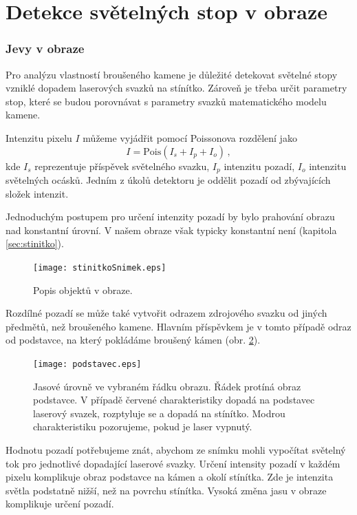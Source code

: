\part{Detekce světelných stop v obraze}
\label{sec:detection}

\section{Jevy v obraze}
Pro analýzu vlastností broušeného kamene je důležité detekovat světelné stopy vzniklé dopadem laserových svazků na stínítko. Zároveň je třeba určit parametry stop, které se budou porovnávat s parametry svazků matematického modelu kamene. 

Intenzitu pixelu $I$ můžeme vyjádřit pomocí Poissonova rozdělení jako 
\begin{equation}
	I = \mathrm{Pois}\left(I_{s}+I_{p}+I_{o}\right)\,,
	\label{eq:intensitu_sum}
\end{equation}
 kde $I_{s}$ reprezentuje příspěvek světelného svazku, $I_{p}$ intenzitu pozadí, $I_{o}$ intenzitu světelných ocásků. Jedním z úkolů detektoru je oddělit pozadí od zbývajících složek intenzit. %
 
Jednoduchým postupem pro určení intenzity pozadí by bylo prahování obrazu nad konstantní úrovní. V našem obraze však typicky konstantní není (kapitola \ref{sec:stinitko}). 

\begin{figure}[h!]
\centering
\texttt{[image: stinitkoSnimek.eps]}
\caption[Popis objektů v obraze.]{Popis objektů v obraze.}
\label{fig: podstavec}
\end{figure}


Rozdílné pozadí se může také vytvořit odrazem zdrojového svazku od jiných předmětů, než broušeného kamene. Hlavním příspěvkem je v tomto případě odraz od podstavce, na který pokládáme broušený kámen (obr. \ref{fig: podstavec}).

\begin{figure}[h!]
\centering
\texttt{[image: podstavec.eps]}
\caption[Vliv odrazu od podstavce na pozadí snímku.]{Jasové úrovně ve vybraném řádku obrazu. Řádek protíná obraz podstavce. V případě červené charakteristiky dopadá na podstavec laserový svazek, rozptyluje se a dopadá na stínítko. Modrou charakteristiku pozorujeme, pokud je laser vypnutý.}
\label{fig: podstavec}
\end{figure}

Hodnotu pozadí potřebujeme znát, abychom ze snímku mohli vypočítat světelný tok pro jednotlivé dopadající laserové svazky. Určení intensity pozadí v každém pixelu komplikuje obraz podstavce na kámen a okolí stínítka. Zde je intenzita světla podstatně nižší, než na povrchu stínítka. Vysoká změna jasu v obraze komplikuje určení pozadí.  

